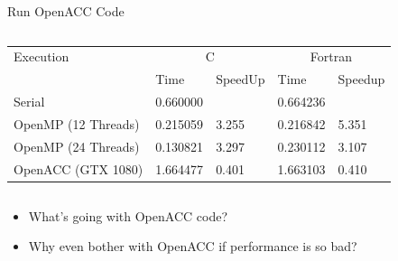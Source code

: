 \documentclass[10pt,t]{beamer}
\begin{document}
\begin{frame}{Run OpenACC Code}
  \begin{columns}
    \begin{exampleblock}{}
      \begin{tabular}{|b|b|b|b|b|}
        \hline
        \rowcolor{lublue}Execution& \multicolumn{2}{c|}{C}& \multicolumn{2}{c|}{Fortran} \\
        \cline{2-5}
        \rowcolor{lublue}&  Time & SpeedUp & Time & Speedup \\
        \hline
        Serial & 0.660000 & & 0.664236 & \\
        OpenMP (12 Threads) & 0.215059 & 3.255 & 0.216842 & 5.351 \\
        OpenMP (24 Threads) & 0.130821 & 3.297 & 0.230112 & 3.107 \\
        OpenACC (GTX 1080) & 1.664477 & 0.401 & 1.663103 & 0.410 \\
          \hline
      \end{tabular}
    \end{exampleblock}
  \end{columns}
  \begin{itemize}
    \item What's going with OpenACC code?
    \item Why even bother with OpenACC if performance is so bad?
  \end{itemize}
\end{frame}
\end{document}
